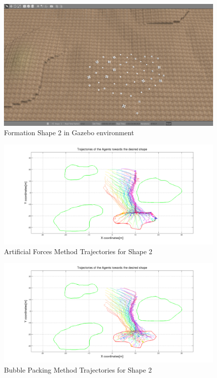 \begin{figure}[H]
\caption{Formation Shape 2 in Gazebo environment}
\centerline{\includegraphics[scale = 0.32]{Trajectories_Formation_Shape_2_1}}
\end{figure} 	
		   
\begin{figure}[H]
\caption{Artificial Forces Method Trajectories for Shape 2}
\centerline{\includegraphics[scale = 0.32]{Artificial_Trajectories_2}}
\end{figure} 	
		   
\begin{figure}[H]
\caption{Bubble Packing Method Trajectories for Shape 2}
\centerline{\includegraphics[scale = 0.32]{Bubble_Trajectories_2}}
\end{figure} 	
		   
